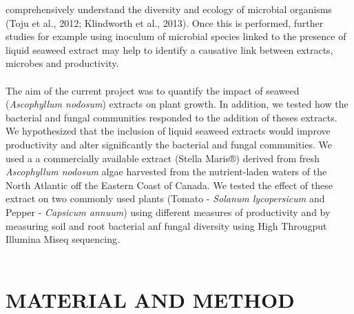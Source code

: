 \documentclass[11pt,]{article}
\begin{document}
comprehensively understand the diversity and ecology of microbial
organisms (Toju et al., 2012; Klindworth et al., 2013). Once this is
performed, further studies for example using inoculum of microbial
species linked to the presence of liquid seaweed extract may help to
identify a causative link between extracts, microbes and productivity.\\
\hspace*{0.333em}\\
The aim of the current project was to quantify the impact of seaweed
(\emph{Ascophyllum nodosum}) extracts on plant growth. In addition, we
tested how the bacterial and fungal communities responded to the
addition of theses extracts. We hypothesized that the inclusion of
liquid seaweed extracts would improve productivity and alter
significantly the bacterial and fungal communities. We used a a
commercially available extract (Stella Maris®) derived from fresh
\emph{Ascophyllum nodosum} algae harvested from the nutrient-laden
waters of the North Atlantic off the Eastern Coast of Canada. We tested
the effect of these extract on two commonly used plants (Tomato -
\emph{Solanum lycopersicum} and Pepper - \emph{Capsicum annuum}) using
different measures of productivity and by measuring soil and root
bacterial anf fungal diversity using High Througput Illumina Miseq
sequencing.\\
\hspace*{0.333em} ~

\section{MATERIAL AND METHOD}\label{material-and-method}
\end{document}
